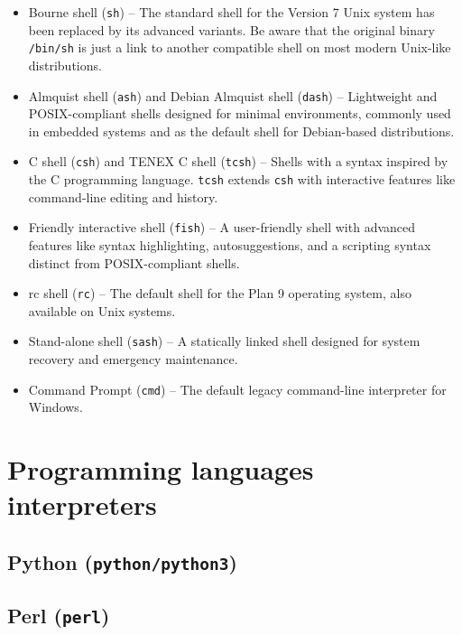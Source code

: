 \begin{itemize}
\item Bourne shell (\texttt{sh}) -- The standard shell for the Version 7 Unix system has been replaced by its advanced variants. Be aware that the original binary \texttt{/bin/sh} is just a link to another compatible shell on most modern Unix-like distributions.
\item Almquist shell (\texttt{ash}) and Debian Almquist shell (\texttt{dash}) -- Lightweight and POSIX-compliant shells designed for minimal environments, commonly used in embedded systems and as the default shell for Debian-based distributions.
\item C shell (\texttt{csh}) and TENEX C shell (\texttt{tcsh}) -- Shells with a syntax inspired by the C programming language. \texttt{tcsh} extends \texttt{csh} with interactive features like command-line editing and history.
\item Friendly interactive shell (\texttt{fish}) -- A user-friendly shell with advanced features like syntax highlighting, autosuggestions, and a scripting syntax distinct from POSIX-compliant shells.
\item rc shell (\texttt{rc}) -- The default shell for the Plan 9 operating system, also available on Unix systems.
\item Stand-alone shell (\texttt{sash}) -- A statically linked shell designed for system recovery and emergency maintenance.
\item Command Prompt (\texttt{cmd}) -- The default legacy command-line interpreter for Windows.
\end{itemize}


\section{Programming languages interpreters}

\subsection{Python (\texttt{python/python3})}





\subsection{Perl (\texttt{perl})}

